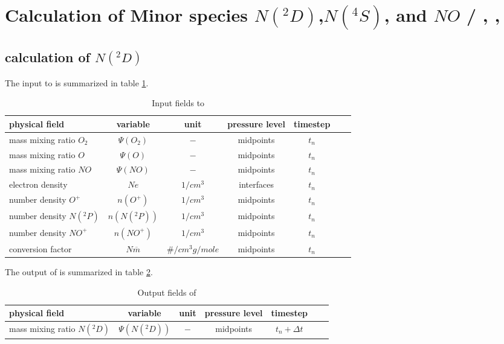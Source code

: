%
\section{Calculation of Minor species $N(^2D)$,$N(^4S)$, and $NO$ / , , }\label{cap:comp_n}
%
\subsection{calculation of $N(^2D)$}\label{subcap:comp_n2d}
%
The input to  is summarized in table
\ref{tab:input_comp_n2d}.
%
\begin{table}[tb]
\begin{tabular}{|p{3.5cm} ||c|c|c|c|c|c|} \hline
physical field               & variable        & unit&pressure
level& timestep
\\ \hline \hline
%
mass mixing ratio $O_2$ &       $\Psi(O_2)$              & $-$   &  midpoints & $t_n$\\
mass mixing ratio $O$ &         $\Psi(O  )$              & $-$   &  midpoints & $t_n$\\
mass mixing ratio $NO$ &       $\Psi(NO)$              & $-$   &  midpoints & $t_n$\\
electron density&       $Ne$              & $1/cm^3$   &  interfaces & $t_n$\\
number density $O^+$&       $n(O^+)$              & $1/cm^3$   &  midpoints & $t_n$\\
number density $N(^2P)$&       $n(N(^2P))$              & $1/cm^3$   &  midpoints & $t_n$\\
number density $NO^+$&       $n(NO^+)$              & $1/cm^3$   &  midpoints & $t_n$\\
conversion factor&       $N \overline{m}$              & $\#/cm^3
g/mole$   &  midpoints & $t_n$
 \\ \hline
\end{tabular}
\caption{Input fields to }
\label{tab:input_comp_n2d}
\end{table}
%
The output of  is summarized in table
\ref{tab:output_comp_n2d}.
%
\begin{table}[tb]
\begin{tabular}{|p{3.5cm} ||c|c|c|c|c|c|} \hline
physical field               & variable        & unit&pressure
level& timestep \\ \hline \hline mass mixing ratio $N(^2D)$ &
$\Psi(N(^2D))$ & $-$ & midpoints & $t_n+\Delta t$
\\ \hline \hline
\end{tabular}
\caption{Output fields of }
\label{tab:output_comp_n2d}
\end{table}
